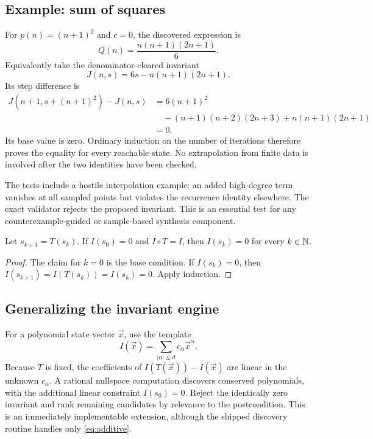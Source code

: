 \subsection{Example: sum of squares}

For $p(n)=(n+1)^2$ and $c=0$, the discovered expression is
\[
 Q(n)=\frac{n(n+1)(2n+1)}6.
\]
Equivalently take the denominator-cleared invariant
\[
 J(n,s)=6s-n(n+1)(2n+1).
\]
Its step difference is
\begin{align*}
 J(n+1,s+(n+1)^2)-J(n,s)
 &=6(n+1)^2\\
 &\quad-(n+1)(n+2)(2n+3)+n(n+1)(2n+1)\\
 &=0.
\end{align*}
Its base value is zero. Ordinary induction on the number of iterations
therefore proves the equality for every reachable state. No extrapolation from
finite data is involved after the two identities have been checked.

The tests include a hostile interpolation example: an added high-degree term
vanishes at all sampled points but violates the recurrence identity elsewhere.
The exact validator rejects the proposed invariant. This is an essential test
for any counterexample-guided or sample-based synthesis component.

\begin{proposition}
Let $s_{k+1}=T(s_k)$. If $I(s_0)=0$ and $I\circ T=I$, then
$I(s_k)=0$ for every $k\in\mathbb{N}$.
\end{proposition}
\begin{proof}
The claim for $k=0$ is the base condition. If $I(s_k)=0$, then
$I(s_{k+1})=I(T(s_k))=I(s_k)=0$. Apply induction.
\end{proof}

\subsection{Generalizing the invariant engine}

For a polynomial state vector $\vec x$, use the template
\[
 I(\vec x)=\sum_{|\alpha|\leq d}c_\alpha\vec x^\alpha.
\]
Because $T$ is fixed, the coefficients of $I(T(\vec x))-I(\vec x)$ are linear
in the unknown $c_\alpha$. A rational nullspace computation discovers conserved
polynomials, with the additional linear constraint $I(s_0)=0$. Reject the
identically zero invariant and rank remaining candidates by relevance to the
postcondition. This is an immediately implementable extension, although the
shipped discovery routine handles only \eqref{eq:additive}.

